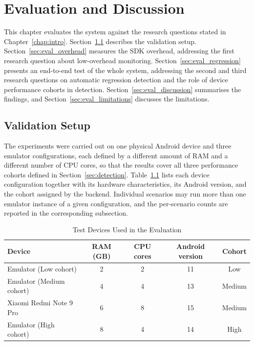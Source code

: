 \chapter{Evaluation and Discussion}
\label{chap:eval}

This chapter evaluates the system against the research questions stated in Chapter~\ref{chap:intro}. Section~\ref{sec:eval_setup} describes the validation setup. Section~\ref{sec:eval_overhead} measures the SDK overhead, addressing the first research question about low-overhead monitoring. Section~\ref{sec:eval_regression} presents an end-to-end test of the whole system, addressing the second and third research questions on automatic regression detection and the role of device performance cohorts in detection. Section~\ref{sec:eval_discussion} summarises the findings, and Section~\ref{sec:eval_limitations} discusses the limitations.

\section{Validation Setup}
\label{sec:eval_setup}

The experiments were carried out on one physical Android device and three emulator configurations, each defined by a different amount of RAM and a different number of CPU cores, so that the results cover all three performance cohorts defined in Section~\ref{sec:detection}. Table~\ref{tab:eval_devices} lists each device configuration together with its hardware characteristics, its Android version, and the cohort assigned by the backend. Individual scenarios may run more than one emulator instance of a given configuration, and the per-scenario counts are reported in the corresponding subsection.

\begin{table}[h]
    \centering
    \caption{Test Devices Used in the Evaluation}
    \label{tab:eval_devices}
    \begin{tabular}{lcccc}
        \toprule
        Device                   & RAM (GB) & CPU cores & Android version & Cohort \\
        \midrule
        Emulator (Low cohort)    & 2        & 2         & 11              & Low    \\
        Emulator (Medium cohort) & 4        & 4         & 13              & Medium \\
        Xiaomi Redmi Note 9 Pro  & 6        & 8         & 15              & Medium \\
        Emulator (High cohort)   & 8        & 4         & 14              & High   \\
        \bottomrule
    \end{tabular}
\end{table}



